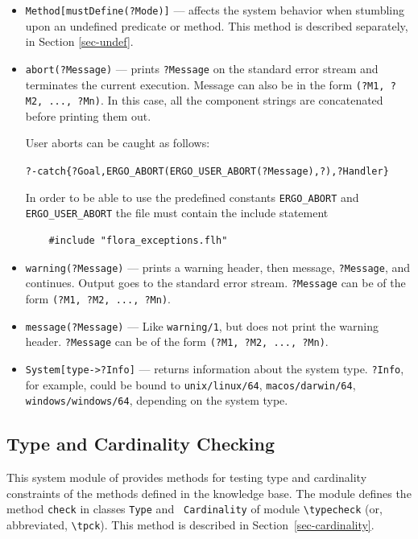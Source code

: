 \documentclass[11pt]{article}
\newcommand{\ERGO}{\mbox{\smaller{\ensuremath{\cal{E}}\smaller{{\sc{RGO}}}}}\xspace}
\newcommand{\FLSYSTEM}{\ERGO}
\newcommand{\FLABORT}{ERGO\_ABORT}
\newcommand{\FLUSERABORT}{ERGO\_USER\_ABORT}
\newcommand{\bs}{\textbackslash}
\begin{document}
\begin{itemize}
\item \texttt{Method[mustDefine(?Mode)]} --- affects the system behavior when
  stumbling upon an undefined predicate or method. This method is described
  separately, in Section \ref{sec-undef}.
  \item  {\tt abort(?Message)} --- prints {\tt ?Message} on the standard error
  stream and terminates the current execution. Message can also be in the
  form {\tt (?M1, ?M2, ..., ?Mn)}. In this case, all the component strings are
  concatenated before printing them out.

  User aborts can be caught as follows:
  \begin{alltt}
   ?- catch\{?Goal, \FLABORT(\FLUSERABORT(?Message),?), ?Handler\}
  \end{alltt}
  In order to be able to use the predefined constants {\tt \FLABORT} and
  {\tt \FLUSERABORT} the file must contain the include statement
  \begin{verbatim}
    #include "flora_exceptions.flh"    
  \end{verbatim}
\item {\tt warning(?Message)} --- prints a warning header, then message,
  {\tt ?Message}, and continues. Output goes to the standard error
  stream. {\tt ?Message} can be of the form {\tt (?M1, ?M2, ..., ?Mn)}.
\item {\tt message(?Message)} --- Like {\tt warning/1}, but does not print
  the warning header. {\tt ?Message} can be of the form {\tt (?M1, ?M2, ..., ?Mn)}.
\item \texttt{System[type->?Info]} --- returns information about the 
  system type. \texttt{?Info}, for example, could be bound to
  \texttt{unix/linux/64},
  \texttt{macos/darwin/64}, \texttt{windows/windows/64}, depending on the
  system type.
\end{itemize}


\subsection{Type and Cardinality Checking}\label{sec-type-sysmod}

This system module of \FLSYSTEM provides methods for testing type and
cardinality
constraints of the methods defined in the \FLSYSTEM knowledge base.  The
module defines the method {\tt check} in classes \texttt{Type} and  {\tt
  Cardinality} of module {\tt \bs{}typecheck} (or, abbreviated,
\texttt{\bs{}tpck}).  This method is described in
Section~\ref{sec-cardinality}.
\end{document}
